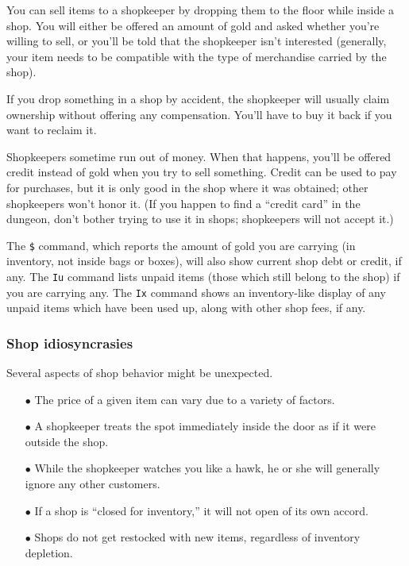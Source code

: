 You can sell items to a shopkeeper by dropping them to the floor while
inside a shop.  You will either be offered an amount of gold and asked
whether you're willing to sell, or you'll be told that the shopkeeper
isn't interested (generally, your item needs to be compatible with the
type of merchandise carried by the shop).

If you drop something in a shop by accident, the shopkeeper will usually
claim ownership without offering any compensation.  You'll have to buy
it back if you want to reclaim it.

Shopkeepers sometime run out of money.
When that happens, you'll be
offered credit instead of gold when you try to sell something.
Credit can be used to pay for purchases, but it is only good in the shop
where it was obtained; other shopkeepers won't honor it.
(If you happen to
find a ``credit card'' in the dungeon, don't bother trying to use it in
shops; shopkeepers will not accept it.)

The {\tt \$} command, which reports the amount of gold you are carrying
(in inventory, not inside bags or boxes), will also show current shop
debt or credit, if any.  The {\tt Iu} command lists unpaid items
(those which still belong to the shop) if you are carrying any.
The {\tt Ix} command shows an inventory-like display of any unpaid
items which have been used up, along with other shop fees, if any.

\subsubsection*{Shop idiosyncrasies}

Several aspects of shop behavior might be unexpected.

\begin{itemize}
\item[$\bullet$]
The price of a given item can vary due to a variety of factors.
\item[$\bullet$]
A shopkeeper treats the spot immediately inside the door as if it were
outside the shop.
\item[$\bullet$]
While the shopkeeper watches you like a hawk, he or she will generally ignore
any other customers.
\item[$\bullet$]
If a shop is ``closed for inventory,'' it will not open of its own accord.
\item[$\bullet$]
Shops do not get restocked with new items, regardless of inventory depletion.
\end{itemize}

